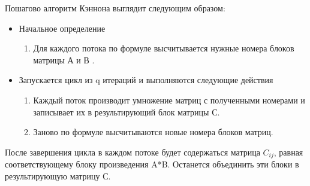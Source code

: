 \documentclass{report}
\begin{document}
Пошагово алгоритм Кэннона выглядит следующим образом:
\begin{itemize}
\item Начальное определение
\begin{enumerate}
\item Для каждого потока по формуле высчитывается нужные номера блоков матрицы А и В .
\end{enumerate}
\end{itemize}
\begin{itemize}
\item Запускается цикл из q итераций и выполняются следующие действия
\begin{enumerate}
\item Каждый поток производит умножение матриц с полученными номерами и записывает их в результирующий блок матрицы С.
\item Заново по формуле высчитываются новые номера блоков матриц.
\end{enumerate}
\end{itemize}

После завершения цикла в каждом потоке будет содержаться матрица $C_{ij}$, равная соответствующему блоку произведения A*B. Останется объединить эти блоки в результирующую матрицу С.

\newpage

\end{document}
